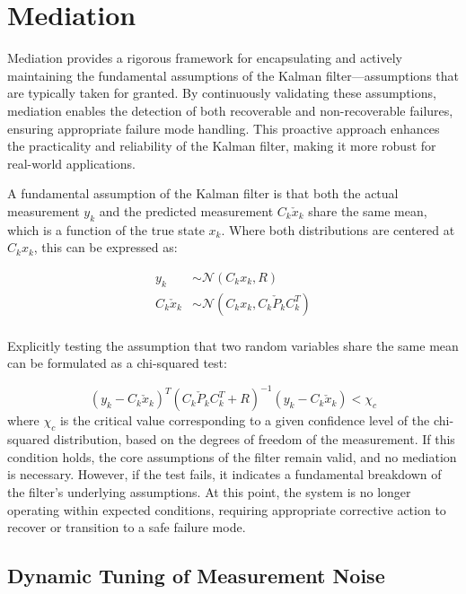 \documentclass[a4paper]{article}
\begin{document}
	\section{Mediation}
	Mediation provides a rigorous framework for encapsulating and actively maintaining the fundamental assumptions of the Kalman filter—assumptions that are typically taken for granted. By continuously validating these assumptions, mediation enables the detection of both recoverable and non-recoverable failures, ensuring appropriate failure mode handling. This proactive approach enhances the practicality and reliability of the Kalman filter, making it more robust for real-world applications.


	A fundamental assumption of the Kalman filter is that both the actual measurement $y_k$ and the predicted measurement $C_k \check{x}_k$ share the same mean, which is a function of the true state $x_k$. Where both distributions are centered at $C_k x_k$, this can be expressed as:

	\begin{align}
		y_k &\sim \mathcal{N} (C_k x_k, R)\\
		C_k \check{x}_k &\sim \mathcal{N} (C_k x_k, C_k \check{P}_k C_k^T)\\
	\end{align}

	Explicitly testing the assumption that two random variables share the same mean can be formulated as a chi-squared test:

	\begin{equation}
		(y_k - C_k \check{x}_k)^T (C_k \check{P}_k C_k^T + R)^{-1} (y_k - C_k \check{x}_k) < \chi_c
		\label{eq:chisquare}
	\end{equation}
	where \( \chi_c \) is the critical value corresponding to a given confidence level of the chi-squared distribution, based on the degrees of freedom of the measurement. If this condition holds, the core assumptions of the filter remain valid, and no mediation is necessary. However, if the test fails, it indicates a fundamental breakdown of the filter’s underlying assumptions. At this point, the system is no longer operating within expected conditions, requiring appropriate corrective action to recover or transition to a safe failure mode.


\subsection{Dynamic Tuning of Measurement Noise}
\end{document}
